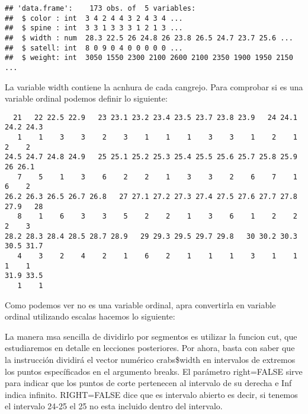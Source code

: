 \documentclass[
]{article}
\newenvironment{Shaded}{\begin{snugshade}}{\end{snugshade}}
\newcommand{\AttributeTok}[1]{\textcolor[rgb]{0.77,0.63,0.00}{#1}}
\newcommand{\ConstantTok}[1]{\textcolor[rgb]{0.00,0.00,0.00}{#1}}
\newcommand{\DecValTok}[1]{\textcolor[rgb]{0.00,0.00,0.81}{#1}}
\newcommand{\FunctionTok}[1]{\textcolor[rgb]{0.00,0.00,0.00}{#1}}
\newcommand{\NormalTok}[1]{#1}
\newcommand{\OtherTok}[1]{\textcolor[rgb]{0.56,0.35,0.01}{#1}}
\newcommand{\SpecialCharTok}[1]{\textcolor[rgb]{0.00,0.00,0.00}{#1}}
\newcommand{\StringTok}[1]{\textcolor[rgb]{0.31,0.60,0.02}{#1}}
\begin{document}
\begin{verbatim}
## 'data.frame':    173 obs. of  5 variables:
##  $ color : int  3 4 2 4 4 3 2 4 3 4 ...
##  $ spine : int  3 3 1 3 3 3 1 2 1 3 ...
##  $ width : num  28.3 22.5 26 24.8 26 23.8 26.5 24.7 23.7 25.6 ...
##  $ satell: int  8 0 9 0 4 0 0 0 0 0 ...
##  $ weight: int  3050 1550 2300 2100 2600 2100 2350 1900 1950 2150 ...
\end{verbatim}

La variable width contiene la acnhura de cada cangrejo. Para comprobar
si es una variable ordinal podemos definir lo siguiente:

\begin{Shaded}
\end{Shaded}

\begin{verbatim}
  21   22 22.5 22.9   23 23.1 23.2 23.4 23.5 23.7 23.8 23.9   24 24.1 24.2 24.3 
   1    1    3    3    2    3    1    1    1    3    3    1    2    1    2    2 
24.5 24.7 24.8 24.9   25 25.1 25.2 25.3 25.4 25.5 25.6 25.7 25.8 25.9   26 26.1 
   7    5    1    3    6    2    2    1    3    3    2    6    7    1    6    2 
26.2 26.3 26.5 26.7 26.8   27 27.1 27.2 27.3 27.4 27.5 27.6 27.7 27.8 27.9   28 
   8    1    6    3    3    5    2    2    1    3    6    1    2    2    2    3 
28.2 28.3 28.4 28.5 28.7 28.9   29 29.3 29.5 29.7 29.8   30 30.2 30.3 30.5 31.7 
   4    3    2    4    2    1    6    2    1    1    1    3    1    1    1    1 
31.9 33.5 
   1    1 
\end{verbatim}

Como podemos ver no es una variable ordinal, apra convertirla en
variable ordinal utilizando escalas hacemos lo siguiente:

La manera msa sencilla de dividirlo por segmentos es utilizar la funcion
cut, que estudiaremos en detalle en lecciones posteriores. Por ahora,
basta con saber que la instrucción dividirá el vector numérico
crabs\$width en intervalos de extremos los puntos específicados en el
argumento breaks. El parámetro right=FALSE sirve para indicar que los
puntos de corte pertenecen al intervalo de su derecha e Inf indica
infinito. RIGHT=FALSE dice que es intervalo abierto es decir, si tenemos
el intervalo 24-25 el 25 no esta incluido dentro del intervalo.

\begin{Shaded}
\end{Shaded}
\end{document}
